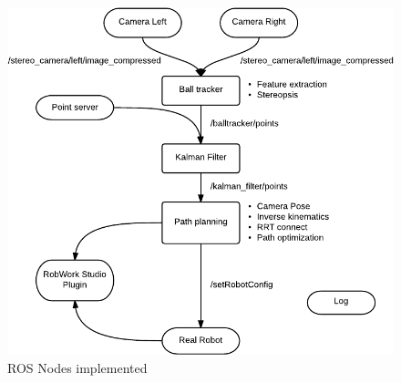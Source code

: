 \begin{figure}[!ht]
	\centering
	\includegraphics[width=\textwidth]{figures/ros_nodes}
	\caption{ROS Nodes implemented}
	\label{fig:ros_nodes}
\end{figure}
